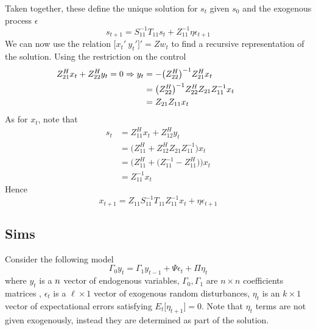 \documentclass[a4paper,10pt]{article}  %
\begin{document}
Taken together, these define the unique solution for $ s_t $ given $ s_0 $ and the exogenous process $ \epsilon $
\begin{equation}
   s_{t+1} = S_{11}^{-1} T_{11} s_t + Z_{11}^{-1} \eta \epsilon_{t+1}
\end{equation}
We can now use the relation $ \Big[x_t' \ y_t'\Big]' = Z w_t$ to find a recursive representation of the solution. Using
the restriction on the control 
\begin{align}
   Z^H_{21} x_t + Z^H_{22} y_t = 0 \Rightarrow y_t & = - \big( Z^H_{22} \big)^{-1} Z^{H}_{21} x_t 
   & \quad \quad & \notag \\
   & = \big( Z^H_{22} \big)^{-1} Z^H_{22} Z_{21} Z_{11}^{-1} x_t \notag \\
   & = Z_{21}Z_{11} x_t
\end{align}
As for $ x_t $, note that
\begin{align*}
   s_t & = Z^H_{11}x_t + Z^H_{12} y_t \\
       & = \Big( Z^H_{11} + Z^H_{12} Z_{21}Z_{11}^{-1} \Big) x_t \\
       & = \bigg( Z^H_{11} + \Big( Z_{11}^{-1} - Z^H_{11} \Big) \bigg) x_t \\
       & = Z_{11}^{-1} x_t
\end{align*}
Hence 
\begin{equation}
   x_{t+1} = Z_{11} S_{11}^{-1} T_{11} Z_{11}^{-1} x_t + \eta \epsilon_{t+1}
\end{equation}


\subsection{Sims} %
\label{sub:sims}



Consider the following model 
\begin{equation}
   \label{eq:sims_format}
   \Gamma_0 y_t = \Gamma_1 y_{t-1} + \Psi \epsilon_t +\Pi \eta_t
\end{equation}
where $ y_t $ is a $ n\time 1 $ vector of endogenous variables, $ \Gamma_0,\Gamma_1 $ are $ n\times n $ coefficients
matrices , $ \epsilon_t $ is a $ \ell\times 1 $ vector of exogenous random disturbances, $ \eta_t $ is an
$ k\times 1 $ vector of expectational errors satisfying $ E_t \big[ \eta_{t+1} \big] =0 $. 
Note that $ \eta_t $ terms are not given exogenously, instead they are determined as part of the solution. 
\end{document}

